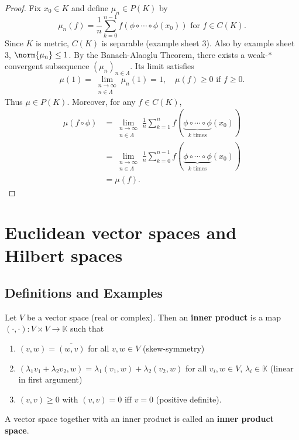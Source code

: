\documentclass{article}
\newcommand{\K}{\mathbb{K}}
\begin{document}
\begin{proof}
    Fix $x_0 \in K$ and define $\mu_n \in P(K)$ by
    \begin{equation*}
        \mu_n(f) = \frac{1}{n} \sum_{k=0}^{n-1} f(\phi \circ \dotsb \circ \phi (x_0)) \text{ for } f \in C(K).
    \end{equation*}
    Since $K$ is metric, $C(K)$ is separable (example sheet 3). Also by example sheet 3, $\norm{\mu_n} \leq 1$.
    By the Banach-Alaoglu Theorem, there exists a weak-$*$ convergent subsequence $(\mu_n)_{n \in \Lambda}$.
    Its limit satisfies
    \begin{equation*}
        \mu(1) = \lim_{\substack{n \to \infty \\ n \in \Lambda}} \mu_n(1) = 1, \quad \mu(f) \geq 0 \text{ if } f \geq 0.
    \end{equation*}
    Thus $\mu \in P(K)$. Moreover, for any $f \in C(K)$,
    \begin{align*}
        \mu(f \circ \phi) &= \lim_{\substack{n \to \infty \\ n \in \Lambda}} \frac{1}{n} \sum_{k=1}^n f(\underbrace{\phi \circ \dotsb \circ \phi}_{k \text{ times}} (x_0)) \\
                          &= \lim_{\substack{n \to \infty \\ n \in \Lambda}} \frac{1}{n} \sum_{k=0}^{n-1} f(\underbrace{\phi \circ \dotsb \circ \phi}_{k \text{ times}} (x_0)) \\
                          &= \mu(f).
    \end{align*}
\end{proof}

\clearpage
\section{Euclidean vector spaces and Hilbert spaces}
\subsection{Definitions and Examples}
\begin{defi}
    Let $V$ be a vector space (real or complex).
    Then an \textbf{inner product} is a map $(\cdot, \cdot): V \times V \to \K$ such that
    \begin{enumerate}[label=(\roman*)]
        \item $(v, w) = \overline{(w, v)}$ for all $v, w \in V$ (skew-symmetry)
        \item $(\lambda_1 v_1 + \lambda_2 v_2, w) = \lambda_1 (v_1, w) + \lambda_2(v_2, w)$ for all $v_i, w \in V$, $\lambda_i \in \K$ (linear in first argument)
        \item $(v, v) \geq 0$ with $(v,v) = 0$ iff $v = 0$ (positive definite).
    \end{enumerate}
    A vector space together with an inner product is called an \textbf{inner product space}.
\end{defi}
\end{document}
